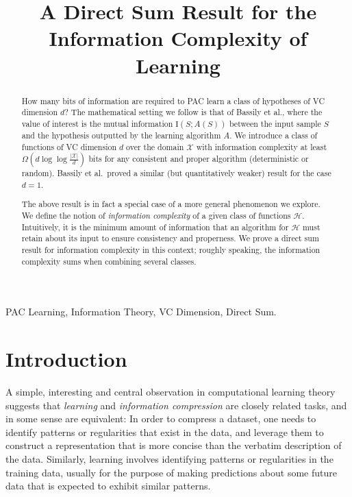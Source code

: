 \documentclass[final,12pt]{colt2018}
\title[A Direct Sum Result for the Information Complexity of Learning]{A Direct Sum Result for the \\ Information Complexity of Learning}
\newcommand{\mc}[1]{\mathcal{#1}}
\newcommand{\cH}{\mc{H}}
\newcommand{\cX}{\mc{X}}
\newcommand{\II}[1]{\mathrm{I}\left(#1\right)}
\begin{document}
\maketitle

\newcommand{\an}[1]{\textcolor{blue}{#1}}
\newcommand{\ann}[1]{\textcolor{red}{#1}}

\begin{abstract}
How many bits of information are required to PAC learn a class of hypotheses of VC dimension $d$? 
The mathematical setting we follow  is that of Bassily et al., where the value of interest is the mutual information $\II{S;A(S)}$ between the input sample $S$ and the hypothesis outputted by the learning algorithm $A$. We introduce a class of functions of VC dimension $d$ over the domain $\cX$
with information complexity at least $\Omega \left(d\log \log \frac{|\cX|}{d}\right)$ bits for any consistent and proper algorithm (deterministic or random).  
{Bassily et al.\ proved a similar (but quantitatively weaker) result for the case $d=1$.}

The above result is in fact a special case of a more general phenomenon we explore. We define the notion of {\em information complexity} of a given
class of functions $\cH$. Intuitively, it is the minimum amount of information that an algorithm for $\cH$ must retain about its input to ensure consistency and properness. We prove a direct sum result for information complexity in this context; roughly speaking, the information complexity sums when combining several classes.\\
\end{abstract}

\begin{keywords}
PAC Learning, Information Theory, VC Dimension, Direct Sum.
\end{keywords}

\section{Introduction}


A simple, interesting and central observation in computational learning theory suggests that {\em learning} and {\em information compression} are closely related tasks, and in some sense are equivalent: In order to compress a dataset, one needs to identify patterns or regularities that exist in the data, and leverage them to construct a representation that is more concise than the verbatim description of the data. Similarly, learning involves identifying patterns or regularities in the training data, usually for the purpose of making predictions about some future data that is expected to exhibit similar patterns.
\end{document}
